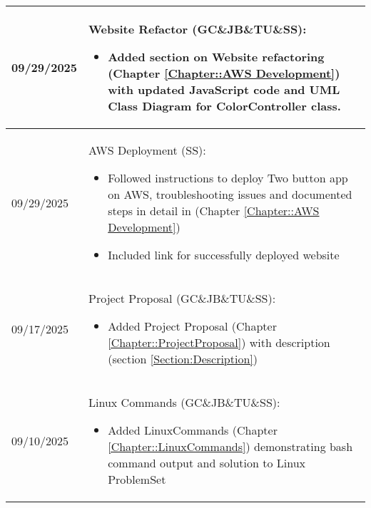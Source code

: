 \begin{longtable}{|l||p{13.5cm}|}
09/29/2025 & Website Refactor (GC\&JB\&TU\&SS):
\begin{itemize}[topsep=0pt,itemsep=0pt,parsep=0pt,partopsep=0pt,leftmargin=12pt]
\item Added section on Website refactoring (Chapter \ref{Chapter::AWS Development}) with updated JavaScript code and UML Class Diagram for ColorController class.
\end{itemize} 
\\ \hline

09/29/2025 & AWS Deployment (SS):
\begin{itemize}[topsep=0pt,itemsep=0pt,parsep=0pt,partopsep=0pt,leftmargin=12pt]
\item Followed instructions to deploy Two button app on AWS, troubleshooting issues and documented steps in detail in (Chapter \ref{Chapter::AWS Development})
\item Included link for successfully deployed website
\end{itemize} 
\\ \hline



09/17/2025 & Project Proposal (GC\&JB\&TU\&SS):
\begin{itemize}[topsep=0pt,itemsep=0pt,parsep=0pt,partopsep=0pt,leftmargin=12pt]
\item Added Project Proposal (Chapter \ref{Chapter::ProjectProposal}) with description (section \ref{Section:Description})
\end{itemize} 
\\ \hline

09/10/2025 & Linux Commands (GC\&JB\&TU\&SS):
\begin{itemize}[topsep=0pt,itemsep=0pt,parsep=0pt,partopsep=0pt,leftmargin=12pt]
\item Added LinuxCommands (Chapter \ref{Chapter::LinuxCommands}) demonstrating bash command output and solution to Linux ProblemSet
\end{itemize} 
\\ \hline


\end{longtable}
